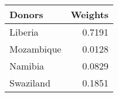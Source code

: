 \begin{tabular}{lr}
\toprule
    Donors &  Weights \\
\midrule
   Liberia &   0.7191 \\
Mozambique &   0.0128 \\
   Namibia &   0.0829 \\
 Swaziland &   0.1851 \\
\bottomrule
\end{tabular}
